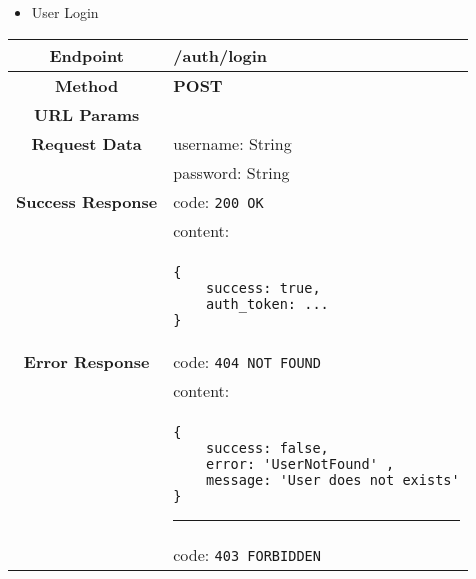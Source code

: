     \begin{itemize}
        \item User Login
    \end{itemize}
    \begin{adjustwidth}{1cm}{}
        \begin{longtable}{|c|l|}
            \hline
            \textbf{Endpoint} & /auth/login \\
            \hline
            \textbf{Method} & \textbf{POST} \\
            \hline
            \textbf{URL Params} &  \\
            \hline
            \textbf{Request Data} & username: String \\
            &                 password: String \\
            \hline
            \textbf{Success Response} & code: \texttt{200 OK} \\
            &                           content: \\
            & \begin{minipage}[t]{0.5\textwidth}
                \begin{adjustwidth}{1.5cm}{}
                \begin{verbatim}
{
    success: true, 
    auth_token: ...
}
                \end{verbatim}
                \end{adjustwidth}
              \end{minipage} \\
              \hline
            \textbf{Error Response} & code: \texttt{404 NOT FOUND} \\
            &                         content: \\
            & \begin{minipage}[t]{0.7\textwidth}
                \begin{adjustwidth}{1.5cm}{}
                \begin{verbatim}
{
    success: false, 
    error: 'UserNotFound' ,
    message: 'User does not exists'
}
                \end{verbatim}
                \end{adjustwidth}
                \par\noindent\rule{\textwidth}{1pt}
                \vspace{4pt}
              \end{minipage} \\
              & code: \texttt{403 FORBIDDEN} \\

\end{longtable}
\end{adjustwidth}
